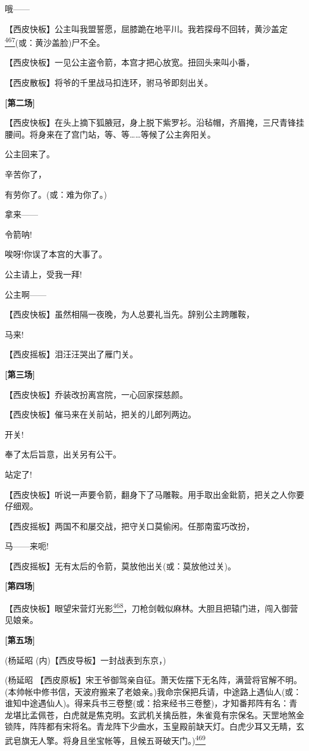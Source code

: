哦------

【西皮快板】公主叫我盟誓愿，屈膝跪在地平川。我若探母不回转，黄沙盖定\protect\hyperlink{fn467}{\textsuperscript{467}}(或：黄沙盖脸)尸不全。

【西皮快板】一见公主盗令箭，本宫才把心放宽。扭回头来叫小番，

【西皮散板】将爷的千里战马扣连环，驸马爷即刻出关。

\textbf{{[}第二场{]}}

【西皮快板】在头上摘下狐腋冠，身上脱下紫罗衫。沿毡帽，齐眉掩，三尺青锋挂腰间。将身来在了宫门站，等、等\ldots{}\ldots{}等候了公主奔阳关。

公主回来了。

辛苦你了，

有劳你了。(或：难为你了。)

拿来------

令箭呐!

唉呀!你误了本宫的大事了。

公主请上，受我一拜!

公主啊------

【西皮快板】虽然相隔一夜晚，为人总要礼当先。辞别公主跨雕鞍，

马来!

【西皮摇板】泪汪汪哭出了雁门关。

\textbf{{[}第三场{]}}

【西皮快板】乔装改扮离宫院，一心回家探慈颜。

【西皮快板】催马来在关前站，把关的儿郎列两边。

开关!

奉了太后旨意，出关另有公干。

站定了!

【西皮快板】听说一声要令箭，翻身下了马雕鞍。用手取出金鈚箭，把关之人你要仔细观。

【西皮摇板】两国不和屡交战，把守关口莫偷闲。任那南蛮巧改扮，

马------来呃!

【西皮摇板】无有太后的令箭，莫放他出关(或：莫放他过关)。

\textbf{{[}第四场{]}}

【西皮快板】眼望宋营灯光影\protect\hyperlink{fn468}{\textsuperscript{468}}，刀枪剑戟似麻林。大胆且把辕门进，闯入御营见娘亲。

\textbf{{[}第五场{]}}

(杨延昭 (内)【西皮导板】一封战表到东京，)

(杨延昭
【西皮原板】宋王爷御驾亲自征。萧天佐摆下无名阵，满营将官解不明。(本帅帐中修书信，天波府搬来了老娘亲。)我命宗保把兵请，中途路上遇仙人(或：谁知中途遇仙人)。得来兵书三卷整(或：拾来经书三卷整)，才知番邦阵有名：青龙堪比孟佩苍，白虎就是焦克明。玄武机关擒岳胜，朱雀竟有宗保名。天罡地煞金锁阵，阵阵都有宋将名。青龙阵下少曲水，玉皇殿前缺天灯。白虎少耳又无睛，玄武皂旗无人擎。将身且坐宝帐等，且候五哥破天门。)\protect\hyperlink{fn469}{\textsuperscript{469}}

